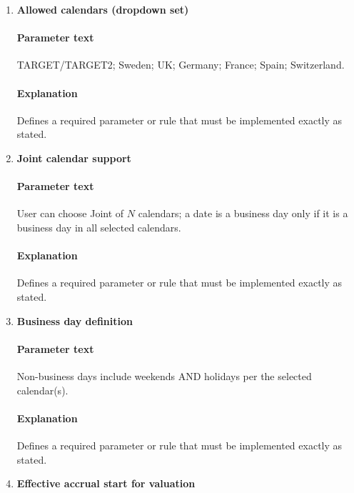 \documentclass[11pt]{article}
\begin{document}
\begin{enumerate}[label=\arabic*),leftmargin=*,align=left]
\paragraph{Parameter text} User chooses the holiday calendar from a dropdown.
\paragraph{Explanation} Defines a required parameter or rule that must be implemented exactly as stated.

\item \textbf{Allowed calendars (dropdown set)}
\paragraph{Parameter text} TARGET/TARGET2; Sweden; UK; Germany; France; Spain; Switzerland.
\paragraph{Explanation} Defines a required parameter or rule that must be implemented exactly as stated.

\item \textbf{Joint calendar support}
\paragraph{Parameter text} User can choose Joint of $N$ calendars; a date is a business day only if it is a business day in all selected calendars.
\paragraph{Explanation} Defines a required parameter or rule that must be implemented exactly as stated.

\item \textbf{Business day definition}
\paragraph{Parameter text} Non-business days include weekends AND holidays per the selected calendar(s).
\paragraph{Explanation} Defines a required parameter or rule that must be implemented exactly as stated.

\item \textbf{Effective accrual start for valuation}

\end{enumerate}
\end{document}
